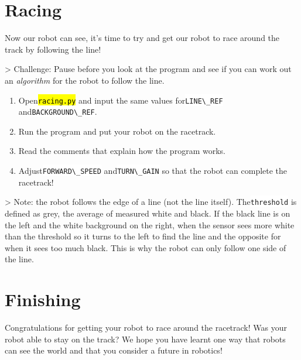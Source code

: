 \documentclass[12pt,a4paper]{article}
\newcommand{\vb}[1]{\hl{\texttt{#1}}} %
\newcommand{\code}[1]{\colorbox{background}{\lstinline{#1}}} %
\begin{document}
\section{ Racing}
Now our robot can see, it's time to try and get our robot to race around the track by following the line!

> Challenge: Pause before you look at the program and see if you can work out an \emph{algorithm} for the robot to follow the line.

\begin{enumerate}
\item Open\vb{racing.py} and input the same values for\code{LINE\_REF} and\code{BACKGROUND\_REF}. 
\item Run the program and put your robot on the racetrack. 
\item Read the comments that explain how the program works. 
\item Adjust\code{FORWARD\_SPEED} and\code{TURN\_GAIN} so that the robot can complete the racetrack! 
\end{enumerate}

> Note: the robot follows the edge of a line (not the line itself). The\code{threshold} is defined as grey, the average of measured white and black. If the black line is on the left and the white background on the right, when the sensor sees more white than the threshold so it turns to the left to find the line and the opposite for when it sees too much black. This is why the robot can only follow one side of the line.

\section{ Finishing}
Congratulations for getting your robot to race around the racetrack! Was your robot able to stay on the track? We hope you have learnt one way that robots can see the world and that you consider a future in robotics!
\end{document}

